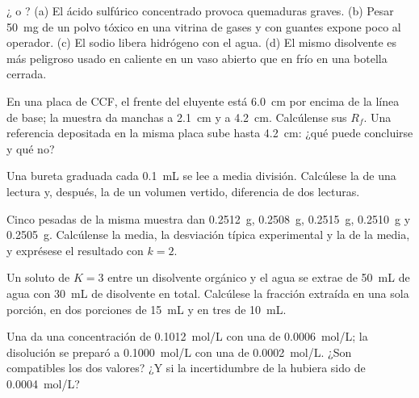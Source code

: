 \begin{exercise}[$\star$]\label{exo:b1:lab-techniques-1:2}
¿ o ? (a) El ácido sulfúrico concentrado provoca
quemaduras graves. (b) Pesar \qty{50}{mg} de un polvo tóxico en una
vitrina de gases y con guantes expone poco al operador. (c) El sodio
libera hidrógeno con el agua. (d) El mismo disolvente es más peligroso
usado en caliente en un vaso abierto que en frío en una botella cerrada.
\end{exercise}

\begin{exercise}[$\star$]\label{exo:b1:lab-techniques-1:3}
En una placa de CCF, el frente del eluyente está \qty{6.0}{cm} por
encima de la línea de base; la muestra da manchas a \qty{2.1}{cm} y a
\qty{4.2}{cm}. Calcúlense sus $R_f$. Una referencia depositada en la
misma placa sube hasta \qty{4.2}{cm}: ¿qué puede concluirse y qué no?
\end{exercise}

\begin{exercise}[$\star$]\label{exo:b1:lab-techniques-1:4}
Una bureta graduada cada \qty{0.1}{mL} se lee a media división.
Calcúlese la  de una lectura y, después, la de un
volumen vertido, diferencia de dos lecturas.
\end{exercise}

\begin{exercise}[$\star\star$]\label{exo:b1:lab-techniques-1:5}
Cinco pesadas de la misma muestra dan \qty{0.2512}{g}, \qty{0.2508}{g},
\qty{0.2515}{g}, \qty{0.2510}{g} y \qty{0.2505}{g}. Calcúlense la media,
la desviación típica experimental y la  de la media,
y exprésese el resultado con $k = 2$.
\end{exercise}

\begin{exercise}[$\star\star$]\label{exo:b1:lab-techniques-1:6}
Un soluto de  $K = 3$ entre un disolvente orgánico
y el agua se extrae de \qty{50}{mL} de agua con \qty{30}{mL} de
disolvente en total. Calcúlese la fracción extraída en una sola porción,
en dos porciones de \qty{15}{mL} y en tres de \qty{10}{mL}.
\end{exercise}

\begin{exercise}[$\star\star$]\label{exo:b1:lab-techniques-1:7}
Una  da una concentración de \qty{0.1012}{mol/L} con una
 de \qty{0.0006}{mol/L}; la disolución se preparó a
\qty{0.1000}{mol/L} con una  de \qty{0.0002}{mol/L}.
¿Son compatibles los dos valores? ¿Y si la incertidumbre de la 
hubiera sido de \qty{0.0004}{mol/L}?
\end{exercise}

